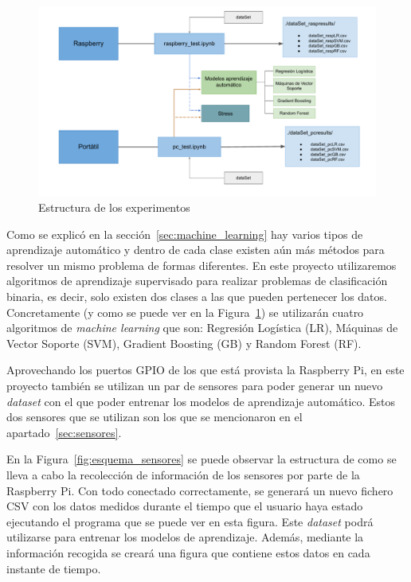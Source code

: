 \documentclass[a4paper, 12pt]{book}
\begin{document}
\begin{figure}[htb]
  \centering
  \includegraphics[width=15cm, keepaspectratio]{img/arquitectura_general.pdf}
  \caption{Estructura de los experimentos}\label{fig:arquitectura}
\end{figure}

Como se explicó en la sección~\ref{sec:machine_learning} hay varios tipos de aprendizaje automático y dentro de cada clase existen aún más métodos para resolver un mismo problema de formas diferentes. En este proyecto utilizaremos algoritmos de aprendizaje supervisado para realizar problemas de clasificación binaria, es decir, solo existen dos clases a las que pueden pertenecer los datos. Concretamente (y como se puede ver en la Figura~\ref{fig:arquitectura}) se utilizarán cuatro algoritmos de \textit{machine learning} que son: Regresión Logística (LR), Máquinas de Vector Soporte (SVM), Gradient Boosting (GB) y Random Forest (RF).

Aprovechando los puertos GPIO de los que está provista la Raspberry Pi, en este proyecto también se utilizan un par de sensores para poder generar un nuevo \textit{dataset} con el que poder entrenar los modelos de aprendizaje automático. Estos dos sensores que se utilizan son los que se mencionaron en el apartado~\ref{sec:sensores}.

En la Figura~\ref{fig:esquema_sensores} se puede observar la estructura de como se lleva a cabo la recolección de información de los sensores por parte de la Raspberry Pi. Con todo conectado correctamente, se generará un nuevo fichero CSV con los datos medidos durante el tiempo que el usuario haya estado ejecutando el programa que se puede ver en esta figura. Este \textit{dataset} podrá utilizarse para entrenar los modelos de aprendizaje. Además, mediante la información recogida se creará una figura que contiene estos datos en cada instante de tiempo.
\end{document}
